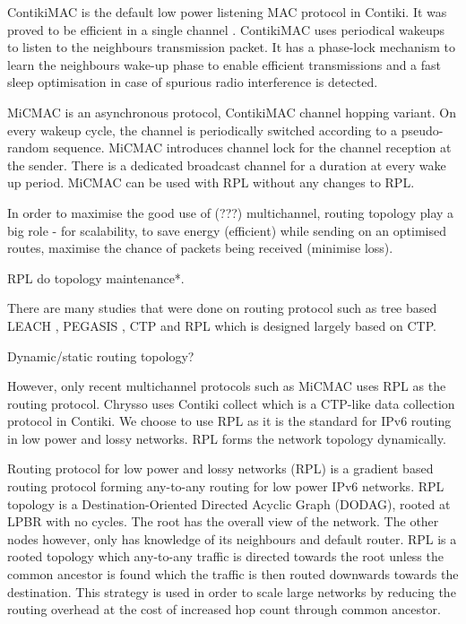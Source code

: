 ContikiMAC \cite{contikimac} is the default low power listening MAC protocol in Contiki. It was proved to be efficient in a single channel \cite{micmac}\cite{orpl}. ContikiMAC uses periodical wakeups to listen to the neighbours transmission packet. It has a phase-lock mechanism to learn the neighbours wake-up phase to enable efficient transmissions and a fast sleep optimisation in case of spurious radio interference is detected.

MiCMAC \cite{micmac} is an asynchronous protocol, ContikiMAC \cite{contikimac} channel hopping variant. On every wakeup cycle, the channel is periodically switched according to a pseudo-random sequence. MiCMAC introduces channel lock for the channel reception at the sender. There is a dedicated broadcast channel for a duration at every wake up period. MiCMAC can be used with RPL without any changes to RPL. %

In order to maximise the good use of (???) multichannel, routing topology play a big role - for scalability, to save energy (efficient) while sending on an optimised routes, maximise the chance of packets being received (minimise loss).

RPL do topology maintenance*.

There are many studies that were done on routing protocol such as tree based LEACH \cite{leach}, PEGASIS \cite{pegasis}, CTP \cite{ctp} and RPL which is designed largely based on CTP.

Dynamic/static routing topology?


However, only recent multichannel protocols such as MiCMAC uses RPL as the routing protocol. Chrysso uses Contiki collect which is a CTP-like data collection protocol in Contiki. We choose to use RPL as it is the standard for IPv6 routing in low power and lossy networks. RPL forms the network topology dynamically.

Routing protocol for low power and lossy networks (RPL) is a gradient based routing protocol forming any-to-any routing for low power IPv6 networks. RPL topology is a Destination-Oriented Directed Acyclic Graph (DODAG), rooted at LPBR with no cycles. The root has the overall view of the network. The other nodes however, only has knowledge of its neighbours and default router. RPL is a rooted topology which any-to-any traffic is directed towards the root unless the common ancestor is found which the traffic is then routed downwards towards the destination. This strategy is used in order to scale large networks by reducing the routing overhead at the cost of increased hop count through common ancestor. 

